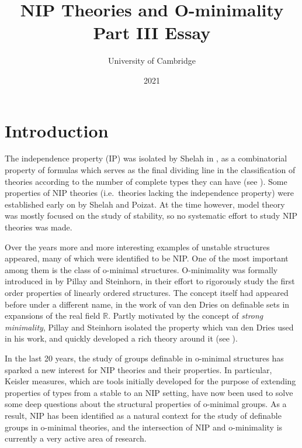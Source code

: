 \documentclass[a4paper]{report}
\newcommand{\ind}{\hspace{15pt}}
\newcommand{\R}{\mathbb{R}}
\theoremstyle{definition}
\theoremstyle{remstyle}
\newcommand{\uchapter}[1]{%
	\chapter*{#1}%
	\markboth{#1}{}%
	\addcontentsline{toc}{chapter}{#1}%
}
\begin{document}
\title{NIP Theories and O-minimality \\ \vspace{+8pt} \large Part III Essay}

\author{University of Cambridge}
\date{2021}

\maketitle

\vspace{+16pt}

\tableofcontents

\newpage


\uchapter{Introduction}

\ind The independence property (IP) was isolated by Shelah in \cite{nip og}, as a combinatorial property of formulas which serves as the final dividing line in the classification of theories according to the number of complete types they can have (see \cite{stability function, six classes}). Some properties of NIP theories (i.e.\ theories lacking the independence property) were established early on by Shelah and Poizat. At the time however, model theory was mostly focused on the study of stability, so no systematic effort to study NIP theories was made.

\ind Over the years more and more interesting examples of unstable structures appeared, many of which were identified to be NIP. One of the most important among them is the class of o-minimal structures. O-minimality was formally introduced in \cite{defI} by Pillay and Steinhorn, in their effort to rigorously study the first order properties of linearly ordered structures. The concept itself had appeared before under a different name, in the work of van den Dries on definable sets in expansions of the real field $\R$. Partly motivated by the concept of \emph{strong minimality}, Pillay and Steinhorn isolated the property which van den Dries used in his work, and quickly developed a rich theory around it (see \cite{defI,defII,discrete,defIII}).

\ind In the last 20 years, the study of groups definable in o-minimal structures has sparked a new interest for NIP theories and their properties. In particular, Keisler measures, which are tools initially developed for the purpose of extending properties of types from a stable to an NIP setting, have now been used to solve some deep questions about the structural properties of o-minimal groups. As a result, NIP has been identified as a natural context for the study of definable groups in o-minimal theories, and the intersection of NIP and o-minimality is currently a very active area of research.
\end{document}
